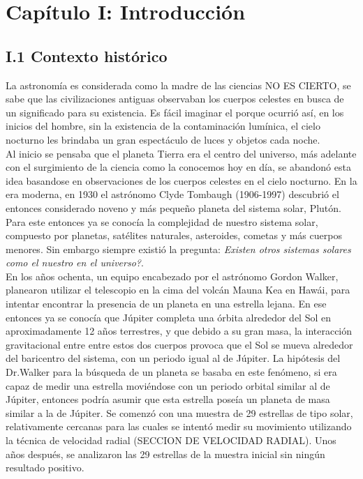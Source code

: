 \chapter*{\textbf{Capítulo I: Introducción}}
\setcounter{chapter}{1}


\section*{I.1 Contexto histórico}

La astronomía es considerada como la madre de las ciencias NO ES CIERTO, se sabe que las civilizaciones antiguas observaban los cuerpos celestes en busca de un significado para su existencia. Es fácil imaginar el porque ocurrió así, en los inicios del hombre, sin la existencia de la contaminación lumínica, el cielo nocturno les brindaba un gran espectáculo de luces y objetos cada noche.\\

Al inicio se pensaba que el planeta Tierra era el centro del universo, más adelante con el surgimiento de la ciencia como la conocemos hoy en día, se abandonó esta idea basandose en observaciones de los cuerpos celestes en el cielo nocturno. En la era moderna, en 1930 el astrónomo Clyde Tombaugh (1906-1997) descubrió el entonces considerado noveno y más pequeño planeta del sistema solar, Plutón. Para este entonces ya se conocía la complejidad de nuestro sistema solar, compuesto por planetas, satélites naturales, asteroides, cometas y más cuerpos menores. Sin embargo siempre existió la pregunta: \textit{Existen otros sistemas solares como el nuestro en el universo?}.\\

En los años ochenta, un equipo encabezado por el astrónomo Gordon Walker, planearon utilizar el telescopio en la cima del volcán Mauna Kea en Hawái, para intentar encontrar la presencia de un planeta en una estrella lejana. En ese entonces ya se conocía que Júpiter completa una órbita alrededor del Sol en aproximadamente 12 años terrestres, y que debido a su gran masa, la interacción gravitacional entre entre estos dos cuerpos provoca que el Sol se mueva alrededor del baricentro del sistema, con un periodo igual al de Júpiter. La hipótesis del Dr.Walker para la búsqueda de un planeta se basaba en este fenómeno, si era capaz de medir una estrella moviéndose con un periodo orbital similar al de Júpiter, entonces podría asumir que esta estrella poseía un planeta de masa similar a la de Júpiter. Se comenzó con una muestra de 29 estrellas de tipo solar, relativamente cercanas para las cuales se intentó medir su movimiento utilizando la técnica de velocidad radial (SECCION DE VELOCIDAD RADIAL). Unos años después, se analizaron las 29 estrellas de la muestra inicial sin ningún resultado positivo.\\ 

